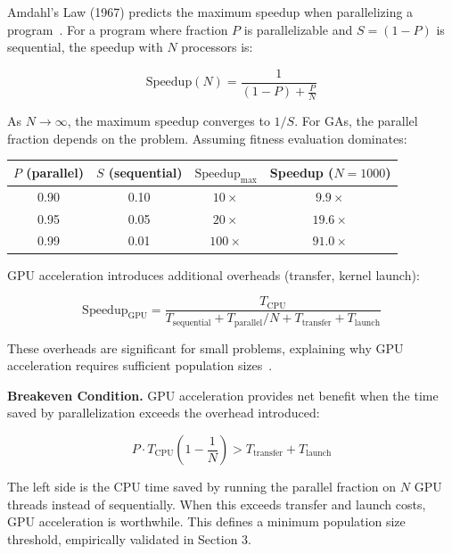\documentclass[a4paper,14pt]{extarticle}
\begin{document}

Amdahl's Law (1967) predicts the maximum speedup when parallelizing a program~\cite{amdahl1967validity}. For a program where fraction $P$ is parallelizable and $S = (1-P)$ is sequential, the speedup with $N$ processors is:

\begin{equation}
\text{Speedup}(N) = \frac{1}{(1-P) + \frac{P}{N}}
\label{eq:amdahl}
\end{equation}

As $N \rightarrow \infty$, the maximum speedup converges to $1/S$. For GAs, the parallel fraction depends on the problem. Assuming fitness evaluation dominates:

\begin{center}
\begin{tabular}{@{}cccc@{}}
\toprule
$P$ (parallel) & $S$ (sequential) & $\text{Speedup}_{\max}$ & Speedup ($N=1000$) \\
\midrule
0.90 & 0.10 & $10\times$ & $9.9\times$ \\
0.95 & 0.05 & $20\times$ & $19.6\times$ \\
0.99 & 0.01 & $100\times$ & $91.0\times$ \\
\bottomrule
\end{tabular}
\end{center}

GPU acceleration introduces additional overheads (transfer, kernel launch):

\begin{equation}
\text{Speedup}_{\text{GPU}} = \frac{T_{\text{CPU}}}{T_{\text{sequential}} + T_{\text{parallel}}/N + T_{\text{transfer}} + T_{\text{launch}}}
\label{eq:gpu_speedup}
\end{equation}

These overheads are significant for small problems, explaining why GPU acceleration requires sufficient population sizes~\cite{mei2024comprehensive,wang2023gpu}.

\textbf{Breakeven Condition.} GPU acceleration provides net benefit when the time saved by parallelization exceeds the overhead introduced:

\begin{equation}
P \cdot T_{\text{CPU}} \left(1 - \frac{1}{N}\right) > T_{\text{transfer}} + T_{\text{launch}}
\label{eq:breakeven}
\end{equation}

The left side is the CPU time saved by running the parallel fraction on $N$ GPU threads instead of sequentially. When this exceeds transfer and launch costs, GPU acceleration is worthwhile. This defines a minimum population size threshold, empirically validated in Section 3.
\end{document}
